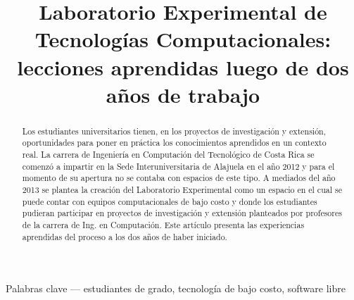 \documentclass[conference]{IEEEtran}
\begin{document}
\title{Laboratorio Experimental de Tecnologías Computacionales: lecciones aprendidas luego de dos años de trabajo}

\author{
\and
{}
\and
{}
}

\maketitle




\begin{abstract}


Los estudiantes universitarios tienen, en los proyectos de investigación y extensión, oportunidades para poner en práctica los conocimientos aprendidos en un contexto real. La carrera de Ingeniería en Computación del Tecnológico de Costa Rica se comenzó a impartir en la Sede Interuniversitaria de Alajuela en el año 2012 y para el momento de su apertura no se contaba con espacios de este tipo. A mediados del año 2013 se plantea la creación del Laboratorio Experimental como un espacio en el cual se puede contar con equipos computacionales de bajo costo y donde los estudiantes pudieran participar en proyectos de investigación y extensión planteados por profesores de la carrera de Ing. en Computación. Este artículo presenta las experiencias aprendidas del proceso a los dos años de haber iniciado. 


\end{abstract}

Palabras clave — estudiantes de grado, tecnología de bajo costo, software libre
\end{document}
